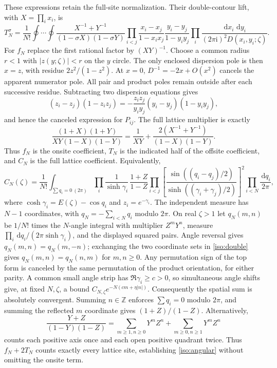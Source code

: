 \documentclass[11pt]{article}
\numberwithin{equation}{section}
\theoremstyle{definition}
\newcommand{\Z}{\mathbb Z}
\newcommand{\ii}{\mathrm i}
\newcommand{\dd}{\,\mathrm d}
\begin{document}
These expressions retain the full-site normalization. Their double-contour
lift, with $X=\prod_i x_i$, is
\begin{equation}
 T_N^\sigma=\frac1{N!}\oint\cdots\oint
 \frac{X^{-1}+Y^{-1}}{(1-\sigma X)(1-\sigma Y)}
 \prod_{i<j}\frac{x_i-x_j}{1-x_ix_j}
             \frac{y_i-y_j}{1-y_iy_j}
 \prod_i\frac{\dd x_i\,\dd y_i}{(2\pi\ii)^2D(x_i,y_i;\zeta)}.
 \label{iso:double}
\end{equation}
For $f_N$ replace the first rational factor by $(XY)^{-1}$. Choose a
common radius $r<1$ with $|z(y;\zeta)|<r$ on the $y$ circle. The only
enclosed dispersion pole is then $x=z$, with residue
$2z^2/(1-z^2)$. At $x=0$, $D^{-1}=-2x+O(x^2)$ cancels the
apparent numerator pole. All pair and product poles remain outside after
each successive residue. Subtracting two dispersion equations gives
\[
 (z_i-z_j)(1-z_i z_j)
 =-\frac{z_i z_j}{y_i y_j}(y_i-y_j)(1-y_i y_j),
\]
and hence the canceled expression for $P_{ij}$. The full lattice
multiplier is exactly
\begin{equation}
 \frac{(1+X)(1+Y)}{XY(1-X)(1-Y)}
 =\frac1{XY}+\frac{2(X^{-1}+Y^{-1})}{(1-X)(1-Y)}.
 \label{iso:sites}
\end{equation}
Thus $f_N$ is the onsite coefficient, $T_N$ is the indicated half of the
offsite coefficient, and $C_N$ is the full lattice coefficient. Equivalently,
\begin{equation}
 C_N(\zeta)=\frac1{N!}\int_{\sum q_i=0\ (2\pi)}
 \prod_i\frac1{\sinh\gamma_i}\,
 \frac{1+Z}{1-Z}
 \prod_{i<j}\left[
 \frac{\sin((q_i-q_j)/2)}{\sinh((\gamma_i+\gamma_j)/2)}
 \right]^2\prod_{i<N}\frac{\dd q_i}{2\pi},
 \label{iso:angular}
\end{equation}
where $\cosh\gamma_i=E(\zeta)-\cos q_i$ and $z_i=e^{-\gamma_i}$.
The independent measure has $N-1$ coordinates, with
$q_N=-\sum_{i<N}q_i$ modulo $2\pi$.
On real $\zeta>1$ let $q_N(m,n)$ be $1/N!$ times the $N$-angle integral with
multiplier $Z^mY^n$, measure
$\prod_i\dd q_i/(2\pi\sinh\gamma_i)$, and the displayed squared pairs.
Angle reversal gives $q_N(m,n)=q_N(m,-n)$; exchanging the two coordinate
sets in \eqref{iso:double} gives $q_N(m,n)=q_N(n,m)$ for $m,n\ge0$.
Any permutation sign of the top form is canceled by the same permutation
of the product orientation, for either parity. A common small angle
strip has $\Re\gamma_i\ge c>0$, so simultaneous angle shifts give, at
fixed $N,\zeta$, a bound $C_{N,\zeta}e^{-N(cm+\eta|n|)}$.
Consequently the spatial sum is absolutely convergent. Summing $n\in\Z$
enforces $\sum q_i=0$ modulo $2\pi$, and summing the reflected $m$
coordinate gives $(1+Z)/(1-Z)$. Alternatively,
\[
 \frac{Y+Z}{(1-Y)(1-Z)}
 =\sum_{m\ge1,n\ge0}Y^mZ^n+
  \sum_{m\ge0,n\ge1}Y^mZ^n
\]
counts each positive axis once and each open positive quadrant twice.
Thus $f_N+2T_N$ counts exactly every lattice site, establishing
\eqref{iso:angular} without omitting the onsite term.
\end{document}
